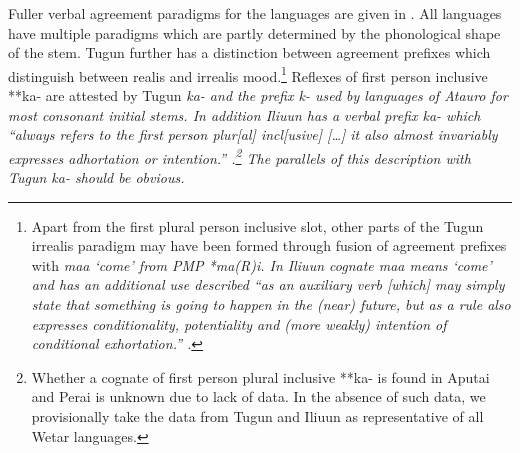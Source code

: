 Fuller verbal agreement paradigms for the 
languages are given in .
All languages have multiple paradigms which are partly determined
by the phonological shape of the stem.
Tugun further has a distinction between agreement prefixes which
distinguish between realis and irrealis mood.\footnote{
Apart from the first plural person
inclusive slot, other parts of the Tugun irrealis paradigm may have been formed
through fusion of agreement prefixes with \it{maa} ‘come’ from PMP *ma(R)i.
In Ili{\Q}uun cognate \it{maa} means ‘come’
and has an additional use described “as an auxiliary verb [which]
may simply state that something is going to happen in the (near)
future, but as a rule also expresses conditionality,
potentiality and (more weakly) intention of conditional exhortation.”
\citep[99]{DeJosselinDeJong1947}.}
Reflexes of 
first person inclusive **ka- are attested by Tugun 
\it{ka-} and the  prefix \it{k-} used by languages of Atauro
for most consonant initial stems.
In addition Ili{\Q}uun has a verbal prefix \it{ka-} which “always
refers to the first person plur[al] incl[usive] [{\ldots}] it
also almost invariably expresses adhortation or intention.”
\citep[98]{DeJosselinDeJong1947}.\footnote{
		Whether a cognate of first
		person plural inclusive **ka- is found in Aputai
		and Perai is unknown due to lack of data.
		In the absence of such data,
		we provisionally take the data from Tugun
		and Ili{\Q}uun as representative of all Wetar languages.}
The parallels of this description with Tugun  \it{ka-} should be obvious.


